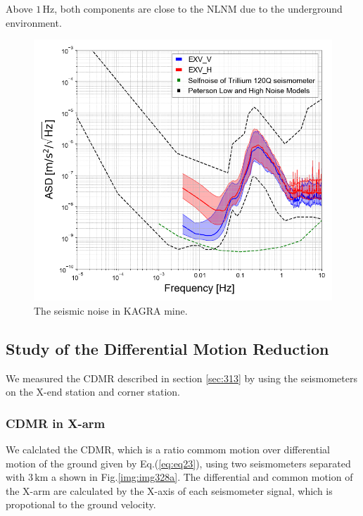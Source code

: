 Above $1\,\mathrm{Hz}$, both components are close to the NLNM due to the underground environment.

\begin{figure}[h]
  \includegraphics[width=13.0cm]{./img_chap3/img313.png}
  \caption{ The seismic noise in KAGRA mine.}\label{img:img313}
\end{figure}



\subsection{Study of the Differential Motion Reduction} \label{sec:332}
We measured the CDMR described in section \cref{sec:313} by using the seismometers on the X-end station and corner station.
\subsubsection{CDMR in X-arm }
We calclated the CDMR, which is a ratio commom motion over differential motion of the ground given by Eq.(\ref{eq:eq23}), using two seismometers separated with $3\,\mathrm{km}$ a shown in Fig.\ref{img:img328a}. The differential and common motion of the X-arm are calculated by the X-axis of each seismometer signal, which is propotional to the ground velocity. 

